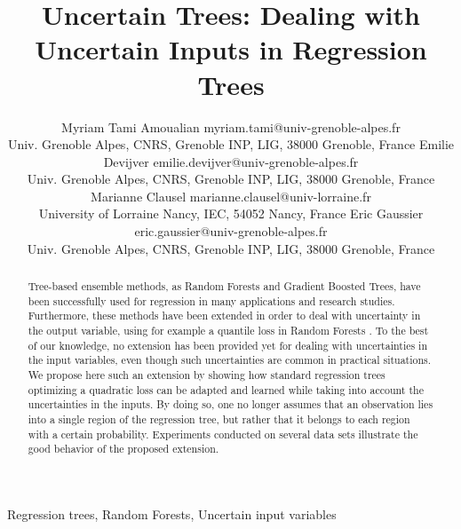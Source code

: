 \documentclass[twoside,11pt]{article}
\begin{document}
\title{Uncertain Trees: Dealing with Uncertain Inputs in Regression Trees}

\author{\name Myriam Tami Amoualian \email myriam.tami@univ-grenoble-alpes.fr\\
       \addr Univ. Grenoble Alpes, CNRS, Grenoble INP, LIG, 38000 Grenoble, France
       \AND
       \name Emilie Devijver \email emilie.devijver@univ-grenoble-alpes.fr\\
       \addr Univ. Grenoble Alpes, CNRS, Grenoble INP, LIG, 38000 Grenoble, France
       \AND
       \name Marianne Clausel \email marianne.clausel@univ-lorraine.fr\\
       \addr University of Lorraine Nancy, IEC, 54052 Nancy, France
       \AND
       \name Eric Gaussier \email eric.gaussier@univ-grenoble-alpes.fr\\
       \addr Univ. Grenoble Alpes, CNRS, Grenoble INP, LIG, 38000 Grenoble, France
       }

\editor{}

\maketitle

\begin{abstract}
Tree-based ensemble methods, as Random Forests and Gradient Boosted Trees, have been successfully used for regression in many applications and research studies. Furthermore, these methods have been extended in order to deal with uncertainty in the output variable, using for example a quantile loss in Random Forests \cite{meinshausen2006quantile}. To the best of our knowledge, no extension has been provided yet for dealing with uncertainties in the input variables, even though such uncertainties are common in practical situations. We propose here such an extension by showing how standard regression trees optimizing a quadratic loss can be adapted and learned while taking into account the uncertainties in the inputs. By doing  so, one no longer assumes that an observation lies into a single region of the regression tree, but rather that it belongs to each region with a certain probability. Experiments conducted on several data sets illustrate the good behavior of the proposed extension.
\end{abstract}

\begin{keywords}
Regression trees, Random Forests, Uncertain input variables
\end{keywords}
\end{document}
